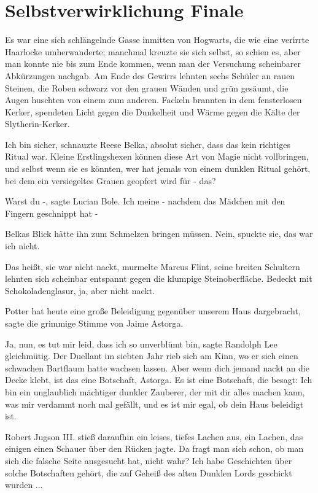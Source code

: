 \chapter{Selbstverwirklichung Finale}

Es war eine sich schlängelnde Gasse inmitten von Hogwarts, die wie eine verirrte
Haarlocke umherwanderte; manchmal kreuzte sie sich selbst, so schien es, aber
man konnte nie bis zum Ende kommen, wenn man der Versuchung scheinbarer
Abkürzungen nachgab. Am Ende des Gewirrs lehnten sechs Schüler an rauen Steinen,
die Roben schwarz vor den grauen Wänden und grün gesäumt, die Augen huschten von
einem zum anderen. Fackeln brannten in dem fensterlosen Kerker, spendeten Licht
gegen die Dunkelheit und Wärme gegen die Kälte der Slytherin-Kerker.

\glqq{}Ich bin sicher\grqq{}, schnauzte Reese Belka, \glqq{}absolut sicher, dass
das kein richtiges Ritual war. Kleine Erstlingshexen können diese Art von Magie
nicht vollbringen, und selbst wenn sie es könnten, wer hat jemals von einem
dunklen Ritual gehört, bei dem ein versiegeltes Grauen geopfert wird für -
das?\grqq{}

\glqq{}Warst du -\grqq{}, sagte Lucian Bole. \glqq{}Ich meine - nachdem das
Mädchen mit den Fingern geschnippt hat -\grqq{}

Belkas Blick hätte ihn zum Schmelzen bringen müssen. \glqq{}Nein\grqq{}, spuckte
sie, \glqq{}das war ich nicht.\grqq{}

\glqq{}Das heißt, sie war nicht nackt\grqq{}, murmelte Marcus Flint, seine
breiten Schultern lehnten sich scheinbar entspannt gegen die klumpige
Steinoberfläche. \glqq{}Bedeckt mit Schokoladenglasur, ja, aber nicht
nackt.\grqq{}

\glqq{}Potter hat heute eine große Beleidigung gegenüber unserem Haus
dargebracht\grqq{}, sagte die grimmige Stimme von Jaime Astorga.

\glqq{}Ja, nun, es tut mir leid, dass ich so unverblümt bin\grqq{}, sagte
Randolph Lee gleichmütig. Der Duellant im siebten Jahr rieb sich am Kinn, wo er
sich einen schwachen Bartflaum hatte wachsen lassen. \glqq{}Aber wenn dich jemand
nackt an die Decke klebt, ist das eine Botschaft, Astorga. Es ist eine
Botschaft, die besagt: Ich bin ein unglaublich mächtiger dunkler Zauberer, der
mit dir alles machen kann, was mir verdammt noch mal gefällt, und es ist mir
egal, ob dein Haus beleidigt ist.\grqq{}

Robert Jugson III. stieß daraufhin ein leises, tiefes Lachen aus, ein Lachen,
das einigen einen Schauer über den Rücken jagte. \glqq{}Da fragt man sich schon,
ob man sich die falsche Seite ausgesucht hat, nicht wahr? Ich habe Geschichten
über solche Botschaften gehört, die auf Geheiß des alten Dunklen Lords geschickt
wurden ...\grqq{}

